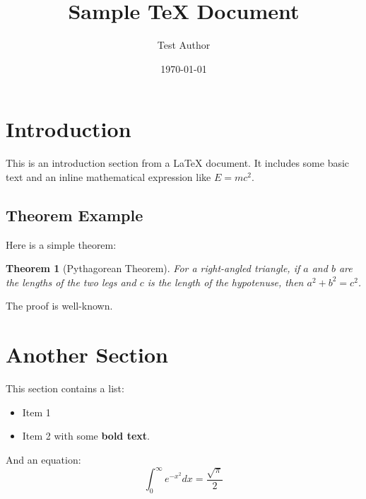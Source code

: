 \documentclass{article}
\title{Sample TeX Document}
\author{Test Author}
\date{\today}
\begin{document}
\maketitle

\section{Introduction}
This is an introduction section from a \LaTeX{} document.
It includes some basic text and an inline mathematical expression like $E = mc^2$.

\subsection{Theorem Example}
Here is a simple theorem:
\newtheorem{theorem}{Theorem}
\begin{theorem}[Pythagorean Theorem]
For a right-angled triangle, if $a$ and $b$ are the lengths of the two legs and $c$ is the length of the hypotenuse, then $a^2 + b^2 = c^2$.
\label{thm:pythagorean}
\end{theorem}

The proof is well-known.

\section{Another Section}
This section contains a list:
\begin{itemize}
    \item Item 1
    \item Item 2 with some \textbf{bold text}.
\end{itemize}
And an equation:
\[ \int_0^\infty e^{-x^2} dx = \frac{\sqrt{\pi}}{2} \]
\end{document}
